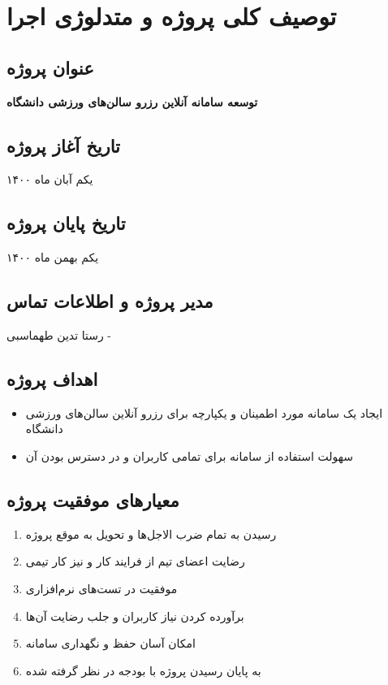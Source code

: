 \section{
توصیف کلی پروژه و متدلوژی اجرا 
}

\subsection*{
عنوان پروژه
}

\textbf{
توسعه سامانه آنلاین رزرو سالن‌های ورزشی دانشگاه
}

\subsection*{
تاریخ آغاز پروژه
}
یکم آبان ماه ۱۴۰۰

\subsection*{
تاریخ پایان پروژه
}
یکم بهمن ماه ۱۴۰۰


\subsection*{
مدیر پروژه و اطلاعات تماس
}
رستا تدین طهماسبی - 


\subsection*{
اهداف پروژه
}

\begin{itemize}
	\item{
	ایجاد یک سامانه مورد اطمینان و یکپارچه برای رزرو آنلاین سالن‌های ورزشی دانشگاه	
	}
	\item{
	سهولت استفاده از سامانه برای تمامی کاربران و در دسترس بودن آن
	}
\end{itemize}


\subsection*{
معیار‌های موفقیت پروژه
}

\begin{enumerate}
	\item {
	رسیدن به تمام ضرب الاجل‌ها و تحویل به موقع پروژه
	}
	\item {
	رضایت اعضای تیم از فرایند کار و نیز کار تیمی
	}
	\item {
	موفقیت در تست‌های نرم‌افزاری
	}
	\item {
	برآورده کردن نیاز کاربران و جلب رضایت آن‌ها
	}
	\item{
امکان آسان حفظ و نگهداری سامانه	
	}
	\item{
به پایان رسیدن پروژه با بودجه در نظر گرفته شده	
	}
\end{enumerate}


